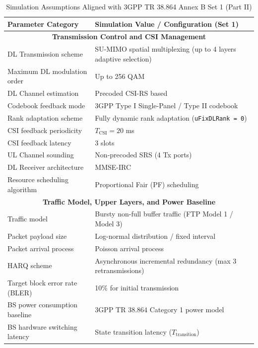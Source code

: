 \begin{table}[htbp]
\centering
\caption{Simulation Assumptions Aligned with 3GPP TR 38.864 Annex B Set 1 (Part II)}
\label{tab:appendix_3gpp_set1_part2}
\renewcommand{\arraystretch}{1.25}
\begin{tabularx}{\textwidth}{|p{}|X|}
\hline
\textbf{Parameter Category} & \textbf{Simulation Value / Configuration (Set 1)} \\ \hline
\multicolumn{2}{|c|}{\textbf{Transmission Control and CSI Management}} \\ \hline
DL Transmission scheme & SU-MIMO spatial multiplexing (up to 4 layers adaptive selection) \\ \hline
Maximum DL modulation order & Up to 256 QAM \\ \hline
DL Channel estimation & Precoded CSI-RS based \\ \hline
Codebook feedback mode & 3GPP Type I Single-Panel / Type II codebook \\ \hline
Rank adaptation scheme & Fully dynamic rank adaptation (\texttt{uFixDLRank = 0}) \\ \hline
CSI feedback periodicity & $T_{\text{CSI}} = 20$ ms \\ \hline
CSI feedback latency & 3 slots \\ \hline
UL Channel sounding & Non-precoded SRS (4 Tx ports) \\ \hline
DL Receiver architecture & MMSE-IRC \\ \hline
Resource scheduling algorithm & Proportional Fair (PF) scheduling \\ \hline
\multicolumn{2}{|c|}{\textbf{Traffic Model, Upper Layers, and Power Baseline}} \\ \hline
Traffic model & Bursty non-full buffer traffic (FTP Model 1 / Model 3) \\ \hline
Packet payload size & Log-normal distribution / fixed interval \\ \hline
Packet arrival process & Poisson arrival process \\ \hline
HARQ scheme & Asynchronous incremental redundancy (max 3 retransmissions) \\ \hline
Target block error rate (BLER) & 10\% for initial transmission \\ \hline
BS power consumption baseline & 3GPP TR 38.864 Category 1 power model \\ \hline
BS hardware switching latency & State transition latency ($T_{\text{transition}}$) \\ \hline
\end{tabularx}
\end{table}